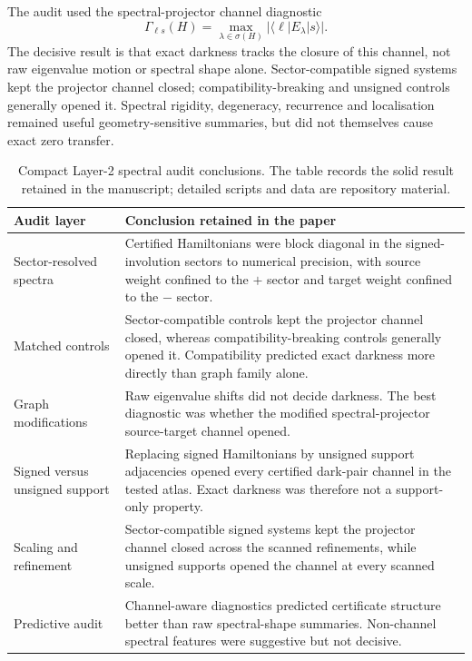 \documentclass[11pt]{article}
\theoremstyle{definition}
\begin{document}
The audit used the spectral-projector channel diagnostic
\[
\Gamma_{\ell s}(H)=\max_{\lambda\in\sigma(H)}|\langle\ell|E_\lambda|s\rangle|.
\]
The decisive result is that exact darkness tracks the closure of this channel, not raw eigenvalue motion or spectral shape alone.  Sector-compatible signed systems kept the projector channel closed; compatibility-breaking and unsigned controls generally opened it.  Spectral rigidity, degeneracy, recurrence and localisation remained useful geometry-sensitive summaries, but did not themselves cause exact zero transfer.

\begin{table}[H]
\centering
\small
\caption{Compact Layer-2 spectral audit conclusions.  The table records the solid result retained in the manuscript; detailed scripts and data are repository material.}
\begin{tabular}{p{}p{}}
\toprule
Audit layer & Conclusion retained in the paper\\
\midrule
Sector-resolved spectra & Certified Hamiltonians were block diagonal in the signed-involution sectors to numerical precision, with source weight confined to the $+$ sector and target weight confined to the $-$ sector.\\
Matched controls & Sector-compatible controls kept the projector channel closed, whereas compatibility-breaking controls generally opened it. Compatibility predicted exact darkness more directly than graph family alone.\\
Graph modifications & Raw eigenvalue shifts did not decide darkness.  The best diagnostic was whether the modified spectral-projector source-target channel opened.\\
Signed versus unsigned support & Replacing signed Hamiltonians by unsigned support adjacencies opened every certified dark-pair channel in the tested atlas.  Exact darkness was therefore not a support-only property.\\
Scaling and refinement & Sector-compatible signed systems kept the projector channel closed across the scanned refinements, while unsigned supports opened the channel at every scanned scale.\\
Predictive audit & Channel-aware diagnostics predicted certificate structure better than raw spectral-shape summaries.  Non-channel spectral features were suggestive but not decisive.\\
\bottomrule
\end{tabular}
\end{table}
\end{document}
